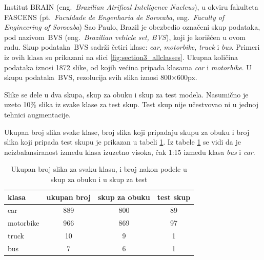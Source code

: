 \documentclass[12pt,oneside]{memoir}
\newcommand{\bvs}{\ensuremath{\,\textrm{BVS}}}
\begin{document}
Institut BRAIN (eng.~\textit{Brazilian Atrifical Inteligence Nucleus}), u okviru fakulteta FASCENS (pt.~\textit{Faculdade de Engenharia de Sorocaba}, eng.~\textit{Faculty of Engineering of Sorocaba}) Sao Paulo, Brazil je obezbedio označeni skup podataka, pod nazivom \bvs{} (eng.~\textit{Brazilian vehicle set, BVS}), koji je korišćen u ovom radu. Skup podataka \bvs{} sadrži četiri klase: \textit{car}, \textit{motorbike}, \textit{truck} i \textit{bus}. Primeri iz ovih klasa su prikazani na slici \ref{fig:section3_allclasses}. Ukupna količina podataka iznosi 1872 slike, od kojih većina pripada klasama \textit{car} i \textit{motorbike}. U skupu podataka \bvs, rezolucija svih slika iznosi 800$\times$600px. 

Slike se dele u dva skupa, skup za obuku i skup za test modela. Nasumično je uzeto 10\% slika iz svake klase za test skup. Test skup nije učestvovao ni u jednoj tehnici augmentacije. 

Ukupan broj slika svake klase, broj slika koji pripadaju skupu za obuku i broj slika koji pripada test skupu je prikazan u tabeli \ref{tab:section4_dostpunipodaci}. Iz tabele \ref{tab:section4_dostpunipodaci} se vidi da je neizbalansiranost između klasa izuzetno visoka, čak 1:15 između klasa \textit{bus} i \textit{car}.

\begin{table}
    \begin{center}
    \caption{Ukupan broj slika za svaku klasu, i broj nakon podele u skup za obuku i u skup za test }\label{tab:section4_dostpunipodaci}
    \begin{tabular}{l|c|c|c}
    klasa & ukupan broj & skup za obuku & test skup\\ 
    \hline
    car & 889 & 800 & 89 \\
    motorbike & 966 & 869 & 97 \\
    truck & 10 & 9 & 1 \\
    bus & 7 & 6 & 1 \\
    \end{tabular}
    \end{center}
\end{table}
\end{document}
